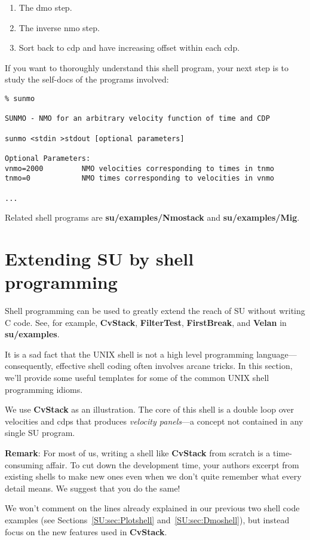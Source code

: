 {{{{{{{\begin{enumerate}
\item The dmo step.

\item The inverse nmo step.

\item Sort back to cdp and have increasing offset within each cdp.
\end{enumerate}

If you want to thoroughly understand this shell program, your next
step is to study the self-docs of the programs involved:

{\small\begin{verbatim}
% sunmo

SUNMO - NMO for an arbitrary velocity function of time and CDP

sunmo <stdin >stdout [optional parameters]

Optional Parameters:
vnmo=2000         NMO velocities corresponding to times in tnmo
tnmo=0            NMO times corresponding to velocities in vnmo

...
\end{verbatim}}\noindent
Related shell programs are {\bf su/examples/Nmostack} and
{\bf su/examples/Mig}.

\section{Extending SU by shell programming}
Shell programming can be used to
greatly extend the reach of {\small\sf SU} without writing C code.
See, for example, {\bf CvStack}, {\bf FilterTest}, {\bf FirstBreak}, and
{\bf Velan} in {\bf su/examples}.

It is a sad fact that the UNIX shell is not
a high level programming language---consequently, effective shell
coding often involves arcane tricks.  In this section, we'll
provide some useful templates for some of the
common UNIX shell programming idioms.

We use {\bf CvStack} as an
illustration.  The core of this shell is a
double loop over velocities and cdps that produces
{\em velocity panels}---a concept
not contained in any single {\small\sf SU} program.

{\bf Remark}:  For most of us,
writing a shell like {\bf CvStack} from scratch is a time-consuming affair.
To cut down the development time,
your authors excerpt from existing shells to make new ones
even when we don't quite remember what every detail means.
We suggest that you do the same!

We won't comment on the lines already explained in our previous
two shell code examples
(see Sections~\ref{SU:sec:Plotshell} and~\ref{SU:sec:Dmoshell}),
but instead focus on the new features used in {\bf CvStack}.

}}}}}}}
